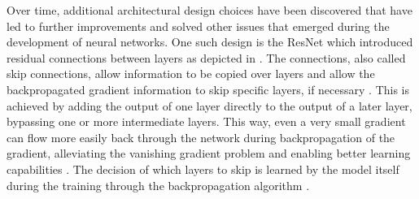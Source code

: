Over time, additional architectural design choices have been discovered that have led to further improvements and solved other issues that emerged during the development of neural networks.
One such design is the ResNet \cite{he2016DeepResidualLearning} which introduced residual connections between layers as depicted in  \cite{he2016DeepResidualLearning, aggarwal2018NeuralNetworksDeep}.
The connections, also called skip connections, allow information to be copied over layers and allow the backpropagated gradient information to skip specific layers, if necessary \cite{he2016DeepResidualLearning, aggarwal2018NeuralNetworksDeep}.
This is achieved by adding the output of one layer directly to the output of a later layer, bypassing one or more intermediate layers.
This way, even a very small gradient can flow more easily back through the network during backpropagation of the gradient, alleviating the vanishing gradient problem and enabling better learning capabilities \cite{he2016DeepResidualLearning, aggarwal2018NeuralNetworksDeep}.
The decision of which layers to skip is learned by the \gls{model} itself during the training through the backpropagation algorithm \cite{he2016DeepResidualLearning, aggarwal2018NeuralNetworksDeep}.

